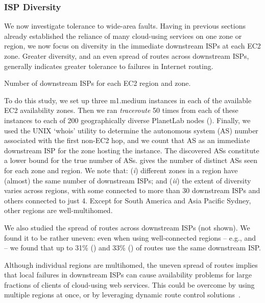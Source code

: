\subsubsection{ISP Diversity}

We now investigate tolerance to wide-area faults. Having in previous sections
already established the reliance of many cloud-using services on one zone or region,
we now focus on diversity in the immediate downstream ISPs at each EC2 zone. Greater
diversity, and an even spread of routes across downstream ISPs,
generally indicates greater tolerance to failures in Internet routing.

\begin{table}[t]
\centering\small

\caption{Number of downstream ISPs for each EC2 region and zone.}
\label{as_number}
\end{table}

To do this study, we set up three m1.medium instances in each of the
available EC2 availability zones.  Then we ran \emph{traceroute}
50 times from each of these instances to each of 200 geographically
diverse PlanetLab nodes ().  Finally, we used
the UNIX `whois' utility to
determine the autonomous system (AS) number associated with the first non-EC2
hop, and we count that AS as an immediate downstream ISP for the zone hosting 
the instance. The discovered ASs constitute a lower bound for the true number of ASs.
 gives the number of distinct
ASs seen for each zone and region.
We note that:
({\em i}) different zones in a region have (almost) the same number of
  downstream ISPs; and
({\em ii}) the extent of diversity varies across regions, with some
  connected to more than 30 downstream ISPs and others
  connected to just 4. Except for South America and Asia Pacific
  Sydney, other regions are well-multihomed.


We also studied the spread of routes across downstream ISPs (not
shown). We found it to be rather uneven: even when using
well-connected regions -- e.g., \awscali and \awseuro -- we found that
up to 31\% (\awscali) and 33\% (\awseuro) of routes use the same
downstream ISP.

 Although individual regions are
multihomed, the uneven spread of routes implies that local failures in
downstream ISPs can cause availability problems for large fractions of
clients of cloud-using web services. This could be overcome by using
multiple regions at once, or by leveraging dynamic route control
solutions~\cite{akella2004multihoming}.


